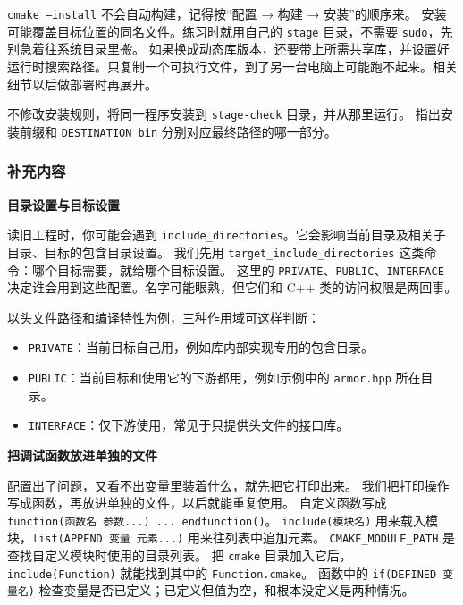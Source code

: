 \begin{note}
\texttt{cmake --install} 不会自动构建，记得按“配置 → 构建 → 安装”的顺序来。
安装可能覆盖目标位置的同名文件。练习时就用自己的 \texttt{stage} 目录，不需要 \texttt{sudo}，先别急着往系统目录里搬。
如果换成动态库版本，还要带上所需共享库，并设置好运行时搜索路径。只复制一个可执行文件，到了另一台电脑上可能跑不起来。相关细节以后做部署时再展开。
\end{note}

\begin{exercise}\label{ex:v1-build-install-prefix}
不修改安装规则，将同一程序安装到 \texttt{stage-check} 目录，并从那里运行。
指出安装前缀和 \texttt{DESTINATION bin} 分别对应最终路径的哪一部分。
\end{exercise}

\subsubsection{补充内容}
\label{sec:cmake-scope}

\textbf{目录设置与目标设置}

读旧工程时，你可能会遇到 \texttt{include\_directories}。它会影响当前目录及相关子目录、目标的包含目录设置。
我们先用 \texttt{target\_include\_directories} 这类命令：哪个目标需要，就给哪个目标设置。
这里的 \texttt{PRIVATE}、\texttt{PUBLIC}、\texttt{INTERFACE} 决定谁会用到这些配置。名字可能眼熟，但它们和 C++ 类的访问权限是两回事。

\begin{conclusion}
以头文件路径和编译特性为例，三种作用域可这样判断：
\begin{itemize}
    \item \texttt{PRIVATE}：当前目标自己用，例如库内部实现专用的包含目录。
    \item \texttt{PUBLIC}：当前目标和使用它的下游都用，例如示例中的 \texttt{armor.hpp} 所在目录。
    \item \texttt{INTERFACE}：仅下游使用，常见于只提供头文件的接口库。
\end{itemize}
\end{conclusion}

\textbf{把调试函数放进单独的文件}

配置出了问题，又看不出变量里装着什么，就先把它打印出来。
我们把打印操作写成函数，再放进单独的文件，以后就能重复使用。
自定义函数写成 \texttt{function(函数名 参数...) ... endfunction()}。
\texttt{include(模块名)} 用来载入模块，\texttt{list(APPEND 变量 元素...)} 用来往列表中追加元素。
\texttt{CMAKE\_MODULE\_PATH} 是查找自定义模块时使用的目录列表。
把 \texttt{cmake} 目录加入它后，\texttt{include(Function)} 就能找到其中的 \texttt{Function.cmake}。
函数中的 \texttt{if(DEFINED 变量名)} 检查变量是否已定义；已定义但值为空，和根本没定义是两种情况。

